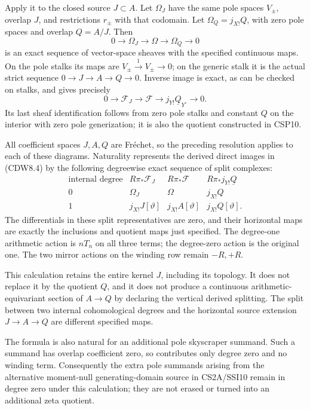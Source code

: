 Apply it to the closed source \(J\subset A\). Let \(\Omega_J\) have the
same pole spaces \(V_\pm\), overlap \(J\), and restrictions \(r_\pm\)
with that codomain. Let \(\Omega_Q=j_{X!}Q\), with zero pole spaces and
overlap \(Q=A/J\). Then \[
0\to\Omega_J\to\Omega\to\Omega_Q\to0
\tag{CDW8.3}
\] is an exact sequence of vector-space sheaves with the specified
continuous maps. On the pole stalks its maps are
\(V_\pm\xrightarrow{1}V_\pm\to0\); on the generic stalk it is the actual
strict sequence \(0\to J\to A\to Q\to0\). Inverse image is exact, as can
be checked on stalks, and gives precisely \[
0\to\mathscr F_J\to\mathscr F\to
j_{Y!}\underline Q_{Y^\circ}\to0.
\tag{CDW8.4}
\] Its last sheaf identification follows from zero pole stalks and
constant \(Q\) on the interior with zero pole generization; it is also
the quotient constructed in CSP10.

All coefficient spaces \(J,A,Q\) are Fréchet, so the preceding
resolution applies to each of these diagrams. Naturality represents the
derived direct images in (CDW8.4) by the following degreewise exact
sequence of split complexes: \[
\begin{array}{c|ccc}
\text{internal degree}&
R\pi_*\mathscr F_J&R\pi_*\mathscr F&
R\pi_*j_{Y!}\underline Q\\ \hline
0&\Omega_J&\Omega&j_{X!}Q\\
1&j_{X!}J[\vartheta]&j_{X!}A[\vartheta]&j_{X!}Q[\vartheta].
\end{array}
\tag{CDW8.5}
\] The differentials in these split representatives are zero, and their
horizontal maps are exactly the inclusions and quotient maps just
specified. The degree-one arithmetic action is \(nT_n\) on all three
terms; the degree-zero action is the original one. The two mirror
actions on the winding row remain \(-R,+R\).

This calculation retains the entire kernel \(J\), including its
topology. It does not replace it by the quotient \(Q\), and it does not
produce a continuous arithmetic-equivariant section of \(A\to Q\) by
declaring the vertical derived splitting. The split between two internal
cohomological degrees and the horizontal source extension
\(J\to A\to Q\) are different specified maps.

The formula is also natural for an additional pole skyscraper summand.
Such a summand has overlap coefficient zero, so contributes only degree
zero and no winding term. Consequently the extra pole summands arising
from the alternative moment-null generating-domain source in CS2A/SSI10
remain in degree zero under this calculation; they are not erased or
turned into an additional zeta quotient.

